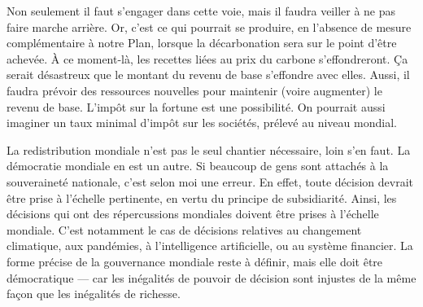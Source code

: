\documentclass[a5paper,french]{memoir}
\begin{document}
Non seulement il faut s'engager dans cette voie, mais il faudra veiller à ne pas faire marche arrière. Or, c'est ce qui pourrait se produire, en l'absence de mesure complémentaire à notre Plan, lorsque la décarbonation sera sur le point d'être achevée. À ce moment-là, les recettes liées au prix du carbone s'effondreront. Ça serait désastreux que le montant du revenu de base s'effondre avec elles. Aussi, il faudra prévoir des ressources nouvelles pour maintenir (voire augmenter) le revenu de base. L'impôt sur la fortune est une possibilité. On pourrait aussi imaginer un taux minimal d'impôt sur les sociétés, prélevé au niveau mondial. 

La redistribution mondiale n'est pas le seul chantier nécessaire, loin s'en faut. La démocratie mondiale en est un autre. Si beaucoup de gens sont attachés à la souveraineté nationale, c'est selon moi une erreur. En effet, toute décision devrait être prise à l'échelle pertinente, en vertu du principe de subsidiarité. Ainsi, les décisions qui ont des répercussions mondiales doivent être prises à l'échelle mondiale. C'est notamment le cas de décisions relatives au changement climatique, aux pandémies, à l'intelligence artificielle, ou au système financier. %
La forme précise de la gouvernance mondiale reste à définir, mais elle doit être démocratique --- car les inégalités de pouvoir de décision sont injustes de la même façon que les inégalités de richesse. %


\end{document}
